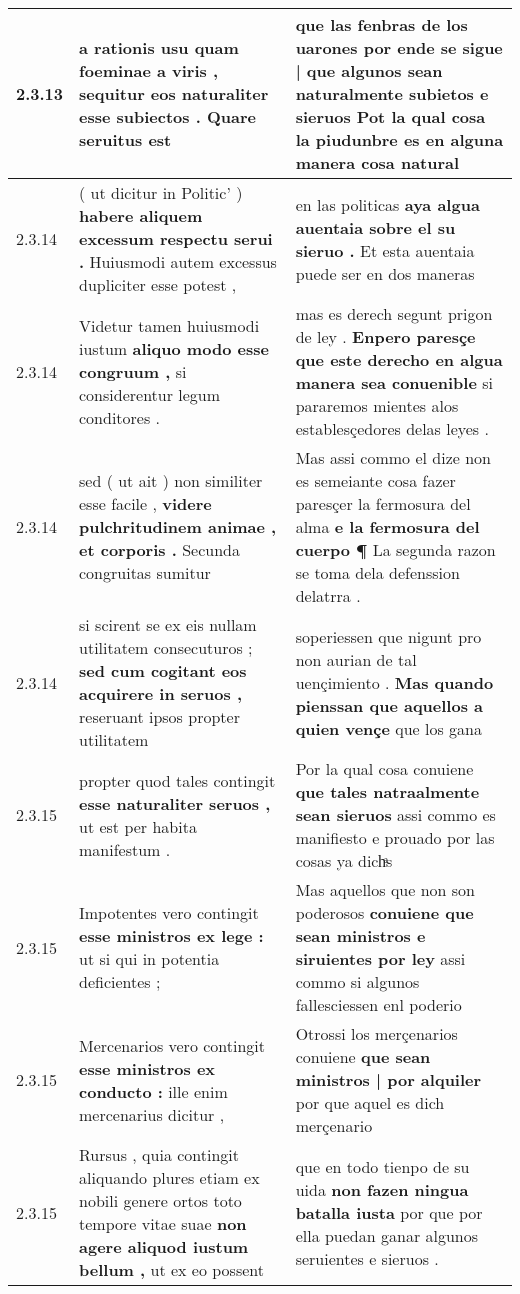 \begin{tabular}{|p{1cm}|p{6.5cm}|p{6.5cm}|}
2.3.13 & a rationis usu quam foeminae a viris , \textbf{ sequitur eos naturaliter esse subiectos . } Quare seruitus est & que las fenbras de los uarones \textbf{ por ende se sigue | que algunos sean naturalmente subietos e sieruos } Pot la qual cosa la piudunbre es en alguna manera cosa natural \\\hline
2.3.14 & ( ut dicitur in Politic’ ) \textbf{ habere aliquem excessum respectu serui . } Huiusmodi autem excessus dupliciter esse potest , & en las politicas \textbf{ aya algua auentaia sobre el su sieruo . } Et esta auentaia puede ser en dos maneras \\\hline
2.3.14 & Videtur tamen huiusmodi iustum \textbf{ aliquo modo esse congruum , } si considerentur legum conditores . & mas es derech segunt prigon de ley . \textbf{ Enpero paresçe que este derecho en algua manera sea conuenible } si pararemos mientes alos establesçedores delas leyes . \\\hline
2.3.14 & sed ( ut ait ) non similiter esse facile , \textbf{ videre pulchritudinem animae , et corporis . } Secunda congruitas sumitur & Mas assi commo el dize non es semeiante cosa fazer paresçer la fermosura del alma \textbf{ e la fermosura del cuerpo ¶ } La segunda razon se toma dela defenssion delatrra . \\\hline
2.3.14 & si scirent se ex eis nullam utilitatem consecuturos ; \textbf{ sed cum cogitant eos acquirere in seruos , } reseruant ipsos propter utilitatem & soperiessen que nigunt pro non aurian de tal uençimiento . \textbf{ Mas quando pienssan que aquellos a quien vençe } que los gana \\\hline
2.3.15 & propter quod tales contingit \textbf{ esse naturaliter seruos , } ut est per habita manifestum . & Por la qual cosa conuiene \textbf{ que tales natraalmente sean sieruos } assi commo es manifiesto e prouado por las cosas ya dichͣs \\\hline
2.3.15 & Impotentes vero contingit \textbf{ esse ministros ex lege : } ut si qui in potentia deficientes ; & Mas aquellos que non son poderosos \textbf{ conuiene que sean ministros e siruientes por ley } assi commo si algunos fallesciessen enl poderio \\\hline
2.3.15 & Mercenarios vero contingit \textbf{ esse ministros ex conducto : } ille enim mercenarius dicitur , & Otrossi los merçenarios conuiene \textbf{ que sean ministros | por alquiler } por que aquel es dich merçenario \\\hline
2.3.15 & Rursus , quia contingit aliquando plures etiam ex nobili genere ortos toto tempore vitae suae \textbf{ non agere aliquod iustum bellum , } ut ex eo possent & que en todo tienpo de su uida \textbf{ non fazen ningua batalla iusta } por que por ella puedan ganar algunos seruientes e sieruos . \\\hline

\end{tabular}

